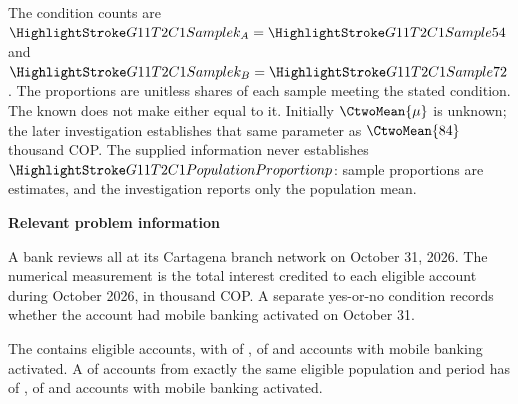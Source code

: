 The condition counts are $\Sam{k_A}=\Sam{54}$ and $\Sam{k_B}=\Sam{72}$. The proportions are unitless shares of each sample meeting the stated condition. The known  does not make either  equal to it. Initially $\CtwoMean{\mu}$ is unknown; the later investigation establishes that same parameter as $\CtwoMean{84}$ thousand COP. The supplied information never establishes $\PP{p}$: sample proportions are estimates, and the investigation reports only the population mean.

\secInicio[][sec:p2]

\clearpage



\textbf{Relevant problem information}

\begin{probleminfoexcerpt}
A bank reviews all      at its Cartagena branch network on October 31, 2026. The numerical measurement is the total interest credited to each eligible account during October 2026, in thousand COP. A separate yes-or-no condition records whether the account had mobile banking activated on October 31.
\end{probleminfoexcerpt}

\begin{probleminfoexcerpt}
The     contains  eligible accounts, with    of   ,    of    and  accounts with mobile banking activated. A     of  accounts from exactly the same eligible population and period has   of   ,    of    and  accounts with mobile banking activated.
\end{probleminfoexcerpt}



